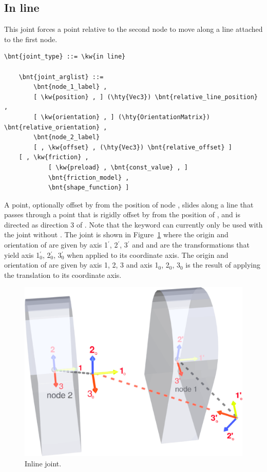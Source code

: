 \subsection{In line}
This joint forces a point relative to the second node to move 
along a line attached to the first node.
\begin{Verbatim}[commandchars=\\\{\}]
    \bnt{joint_type} ::= \kw{in line}

    \bnt{joint_arglist} ::= 
        \bnt{node_1_label} , 
        [ \kw{position} , ] (\hty{Vec3}) \bnt{relative_line_position} ,
        [ \kw{orientation} , ] (\hty{OrientationMatrix}) \bnt{relative_orientation} ,
        \bnt{node_2_label}
        [ , \kw{offset} , (\hty{Vec3}) \bnt{relative_offset} ]
	[ , \kw{friction} ,
            [ \kw{preload} , \bnt{const_value} , ]
            \bnt{friction_model} , 
            \bnt{shape_function} ]
\end{Verbatim}
A point, optionally offset by  from the position
of node , slides along a line that passes through a point 
that is rigidly offset by 
from the position of , and is directed as direction 3 
of .
Note that the  keyword can currently only be used with the  joint without .
The joint is shown in Figure~\ref{fig:el:joint:INLINE} where the origin and orientation of  are given by axis 1$^\prime$, 2$^\prime$, 3$^\prime$ and  and  are the transformations that yield axis 1$^\prime_0$, 2$^\prime_0$, 3$^\prime_0$ when applied to its coordinate axis. The origin and orientation of  are given by axis 1, 2, 3 and axis 1$_0$, 2$_0$, 3$_0$ is the result of applying the  translation to its coordinate axis.
\begin{figure}
\centering
\includegraphics[width=.5\textwidth]{inline}
\caption{Inline joint.}
\label{fig:el:joint:INLINE}
\end{figure}
